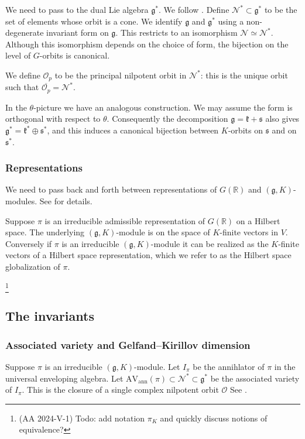 \documentclass[10pt,leqno]{article}
\renewcommand{\O}{\mathcal O}
\newcommand{\R}{\mathbb R}
\newcommand{\N}{\mathcal N}
\newcommand{\g}{\mathfrak g}
\newcommand{\s}{\mathfrak s}
\newcommand{\AVann}{\mathrm{AV}_{\mathrm{ann}}}
\begin{document}
We need to pass to the dual Lie algebra $\g^*$. We follow  \cite[Section 2]{AVAV}.
Define $\N^*\subset \g^*$ to be the set of elements whose orbit is a cone.
We identify $\g$ and $\g^*$ using  a non-degenerate invariant form on $\g$.
This restricts to an isomorphism $\N\simeq \N^*$. Although this isomorphism depends on the choice of form,
the bijection on the level of $G$-orbits is canonical.

We define $\O_p$ to be the principal nilpotent orbit in $\N^*$: this is the unique orbit such that $\overline{\O_p}=\N^*$.

In the $\theta$-picture we have an analogous construction. We may assume the form is orthogonal with respect to $\theta$.
Consequently the decomposition $\g=\mathfrak k+\s$ also gives $\g^*=\mathfrak k^*\oplus \s^*$, and this induces
a canonical bijection between $K$-orbits on $\s$ and on $\s^*$.


\subsubsection*{Representations} 

We need to pass back and forth between representations of $G(\R)$ and $(\g,K)$-modules.
See \cite{greenbook} for details.

Suppose $\pi$ is an irreducible admissible representation of $G(\R)$  on a Hilbert space. 
The underlying
$(\g,K)$-module is on the space of $K$-finite vectors in
$V$. Conversely if $\pi$ is an irreducible $(\g,K)$-module it can be
realized as the $K$-finite vectors of a Hilbert space representation, which we
refer to as the Hilbert space globalization of $\pi$.

\footnote{(AA 2024-V-1) Todo: add notation $\pi_K$ and quickly discuss notions of equivalence?}

\subsection{The invariants}\label{sec:invariants}


\subsubsection*{Associated variety and Gelfand--Kirillov dimension}


Suppose $\pi$ is an irreducible $(\g,K)$-module.
Let $I_\pi$ be the annihlator of $\pi$ in the universal enveloping algebra.
Let $\AVann(\pi)\subset\N^*\subset \g^*$ be the associated variety of $I_\pi$.
This is the closure of a single complex nilpotent orbit $\O$
See \cite[Section 1, Theorem 4.7]{vogan_bowdoin}.
\end{document}
